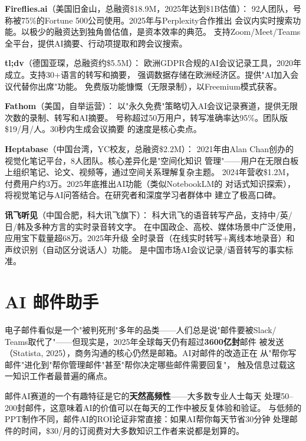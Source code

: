 \textbf{Fireflies.ai}（美国旧金山，总融资\$18.9M，2025年达到\$1B估值）：
92人团队，号称被75\%的Fortune 500公司使用。2025年与Perplexity合作推出
会议内实时搜索功能。以极少的融资达到独角兽估值，是资本效率的典范。
支持Zoom/Meet/Teams全平台，提供AI摘要、行动项提取和跨会议搜索。

\textbf{tl;dv}（德国亚琛，总融资约\$5.5M）：
欧洲GDPR合规的AI会议记录工具，2020年成立。支持30+语言的转写和摘要，
强调数据存储在欧洲经济区。提供"AI加入会议代替你出席"功能。
免费版功能慷慨（无限录制），以Freemium模式获客。

\textbf{Fathom}（美国，自举运营）：
以"永久免费"策略切入AI会议记录赛道，提供无限次数的录制、转写和AI摘要。
号称超过50万用户，转写准确率达95\%。团队版\$19/月/人。30秒内生成会议摘要
的速度是核心卖点。

\textbf{Heptabase}（中国台湾，YC校友，总融资\$2.2M）：
2021年由Alan Chan创办的视觉化笔记平台，8人团队。核心差异化是"空间化知识
管理"——用户在无限白板上组织笔记、论文、视频等，通过空间关系理解复杂主题。
2024年营收\$1.2M，付费用户约3万。2025年底推出AI功能（类似NotebookLM的
对话式知识探索），将视觉笔记与AI问答结合。在研究者和深度学习者群体中
建立了极高口碑。

\textbf{讯飞听见}（中国合肥，科大讯飞旗下）：
科大讯飞的语音转写产品，支持中/英/日/韩及多种方言的实时录音转文字。
在中国政企、高校、媒体场景中广泛使用，应用宝下载量超68万。2025年升级
全时录音（在线实时转写+离线本地录音）和声纹识别（自动区分说话人）功能。
是中国市场AI会议记录/语音转写的事实标准。



\section{AI 邮件助手}
\label{sec:cprod-email}

电子邮件看似是一个"被判死刑"多年的品类——人们总是说"邮件要被Slack/
Teams取代了"——但现实是，2025年全球每天仍有超过\textbf{3600亿封}邮件
被发送（Statista, 2025），商务沟通的核心仍然是邮箱。AI对邮件的改造正在
从"帮你写邮件"进化到"帮你管理邮件"甚至"帮你决定哪些邮件需要回复"，
触及信息过载这一知识工作者最普遍的痛点。

邮件AI赛道的一个有趣特征是它的\textbf{天然高频性}——大多数专业人士每天
处理50--200封邮件，这意味着AI的价值可以在每天的工作中被反复体验和验证。
与低频的PPT制作不同，邮件AI的ROI论证非常直接：如果AI帮你每天节省30分钟
处理邮件的时间，\$30/月的订阅费对大多数知识工作者来说都是划算的。

